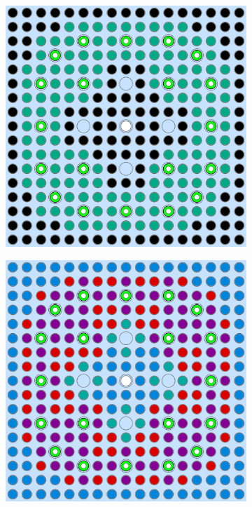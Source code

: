 \begin{figure}[h!]
\begin{subfigure}{0.47\textwidth}
  \includegraphics[width=0.9\linewidth]{figures/unsupervised/geometries/with-features/2-clusters/combined/assm-31-20BPs}
  \caption{}
  \label{fig:chap10-assm-31-20BPs-combined-2}
\end{subfigure}
\begin{subfigure}{0.47\textwidth}
  \centering
  \includegraphics[width=0.9\linewidth]{figures/unsupervised/geometries/with-features/4-clusters/pinch/assm-31-20BPs}

\end{subfigure}
\end{figure}
